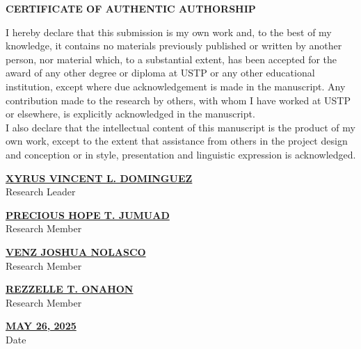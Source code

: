 \thispagestyle{plain}
{\baselineskip
	\begin{center}
		{\bf CERTIFICATE OF AUTHENTIC AUTHORSHIP}\\[24pt]
	\end{center}
	I hereby declare that this submission is my own work and, to the best of my knowledge, it contains no materials previously published or written by another person, nor material which, to a substantial extent, has been accepted for the award of any other degree or diploma at USTP or any other educational institution, except where due acknowledgement is made in the manuscript. Any contribution made to the research by others, with whom I have worked at USTP or elsewhere, is explicitly acknowledged in the manuscript.\\
	I also declare that the intellectual content of this manuscript is the product of my own work, except to the extent that assistance from others in the project design and conception or in style, presentation and linguistic expression is acknowledged.\\[12pt]
	\vspace{36pt}
	
	\noindent
	\begin{minipage}[t]{0.40\textwidth}
		\noindent\underline{\textbf{XYRUS VINCENT L. DOMINGUEZ}}\\
		Research Leader
	\end{minipage}%
	\hfill
	\begin{minipage}[t]{0.40\textwidth}
		\noindent\underline{\textbf{PRECIOUS HOPE T. JUMUAD}}\\
		Research Member
	\end{minipage}
	
	\vspace{36pt}
	
	\noindent
	\begin{minipage}[t]{0.40\textwidth}
		\noindent\underline{\textbf{VENZ JOSHUA NOLASCO}}\\
		Research Member
	\end{minipage}%
	\hfill
	\begin{minipage}[t]{0.39\textwidth}
		\noindent \underline{\textbf{REZZELLE T. ONAHON}}\\
		Research Member
	\end{minipage}
	
	\vspace{24pt}
	\begin{center}
		\noindent\underline{\textbf{MAY 26, 2025}}\\
		Date
	\end{center}
}